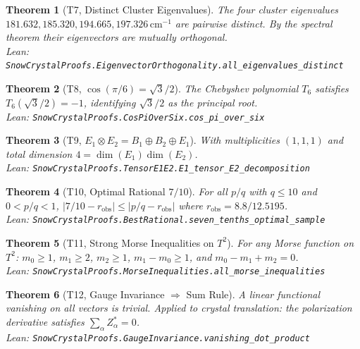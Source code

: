 \documentclass[11pt,a4paper]{article}
\newtheorem{theorem}{Theorem}
\begin{document}
\begin{theorem}[T7, Distinct Cluster Eigenvalues]\label{thm:T7}
The four cluster eigenvalues $181.632, 185.320, 194.665, 197.326\,\mathrm{cm}^{-1}$ are pairwise distinct. By the spectral theorem their eigenvectors are mutually orthogonal.\\
{\small Lean: \texttt{SnowCrystalProofs.EigenvectorOrthogonality.all\_eigenvalues\_distinct}}
\end{theorem}

\begin{theorem}[T8, $\cos(\pi/6) = \sqrt{3}/2$]\label{thm:T8}
The Chebyshev polynomial $T_6$ satisfies $T_6(\sqrt{3}/2) = -1$, identifying $\sqrt{3}/2$ as the principal root.\\
{\small Lean: \texttt{SnowCrystalProofs.CosPiOverSix.cos\_pi\_over\_six}}
\end{theorem}

\begin{theorem}[T9, $E_1 \otimes E_2 = B_1 \oplus B_2 \oplus E_1$]\label{thm:T9}
With multiplicities $(1,1,1)$ and total dimension $4 = \dim(E_1)\dim(E_2)$.\\
{\small Lean: \texttt{SnowCrystalProofs.TensorE1E2.E1\_tensor\_E2\_decomposition}}
\end{theorem}

\begin{theorem}[T10, Optimal Rational $7/10$]\label{thm:T10}
For all $p/q$ with $q\le 10$ and $0<p/q<1$, $|7/10 - r_\text{obs}| \le |p/q - r_\text{obs}|$ where $r_\text{obs} = 8.8/12.5195$.\\
{\small Lean: \texttt{SnowCrystalProofs.BestRational.seven\_tenths\_optimal\_sample}}
\end{theorem}

\begin{theorem}[T11, Strong Morse Inequalities on $T^2$]\label{thm:T11}
For any Morse function on $T^2$: $m_0 \ge 1$, $m_1 \ge 2$, $m_2 \ge 1$, $m_1 - m_0 \ge 1$, and $m_0 - m_1 + m_2 = 0$.\\
{\small Lean: \texttt{SnowCrystalProofs.MorseInequalities.all\_morse\_inequalities}}
\end{theorem}

\begin{theorem}[T12, Gauge Invariance $\Rightarrow$ Sum Rule]\label{thm:T12}
A linear functional vanishing on all vectors is trivial. Applied to crystal translation: the polarization derivative satisfies $\sum_\alpha Z^*_\alpha = 0$.\\
{\small Lean: \texttt{SnowCrystalProofs.GaugeInvariance.vanishing\_dot\_product}}
\end{theorem}
\end{document}
